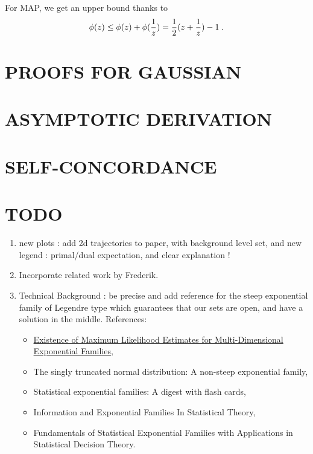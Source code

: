 \documentclass[twoside]{article}
\let\oldsection\section
\renewcommand{\section}[1]{\oldsection{\texorpdfstring{\uppercase{#1}}{#1}}}
\begin{document}
For MAP, we get an upper bound thanks to
\begin{align}
	\label{eq:log_bound}
	\phi(z) \leq \phi(z) + \phi(\frac{1}{z}) =  \frac{1}{2} (z + \frac{1}{z}) - 1 \; .
\end{align}

\section{PROOFS FOR GAUSSIAN}
\label{app:gaussian}

\section{ASYMPTOTIC DERIVATION}
\label{app:asymptote}

\section{SELF-CONCORDANCE}
\label{app:self-concordant}

\section{TODO}
\begin{enumerate}
	\item new plots : add 2d trajectories to paper, with background level set, and new legend : primal/dual expectation, and clear explanation !
	\item Incorporate related work by Frederik.
	\item Technical Background : be precise and add reference for the steep exponential family of Legendre type which guarantees that our sets are open, and have a solution in the middle.
	References: \begin{itemize}
		\item \href{https://www.jstor.org/stable/4616462?seq=1#metadata_info_tab_contents}{Existence of Maximum Likelihood Estimates for Multi-Dimensional Exponential Families},
		\item The singly truncated normal distribution: A non-steep exponential family,
		\item Statistical exponential families: A digest with flash cards,
		\item Information and Exponential Families In Statistical Theory,
		\item Fundamentals of Statistical Exponential Families with Applications in Statistical Decision Theory.
	\end{itemize}
\end{enumerate}
\end{document}

